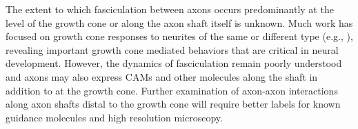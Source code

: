 The extent to which fasciculation between axons occurs predominantly at the level of the growth cone or along the axon shaft itself is unknown.
Much work has focused on growth cone responses to neurites of the same or different type (e.g., ), revealing important growth cone mediated behaviors that are critical in neural development. 
However, the dynamics of fasciculation remain poorly understood and axons may also express CAMs and other molecules along the shaft in addition to at the growth cone. 
Further examination of axon-axon interactions along axon shafts distal to the growth cone will require better labels for known guidance molecules and high resolution microscopy.